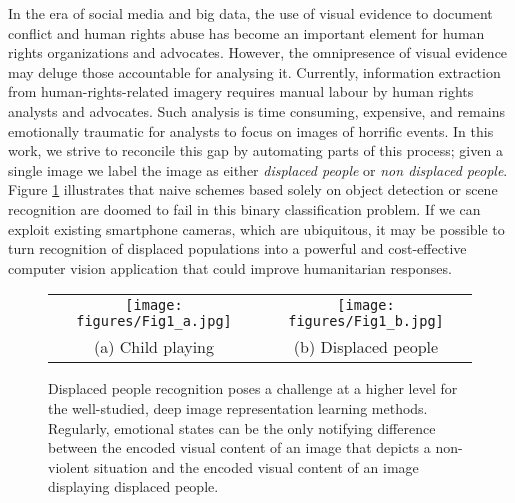\documentclass[10pt,twocolumn,letterpaper]{article}
\begin{document}
In the era of social media and big data, the use of visual evidence to document conflict and human rights abuse has become an important element for human rights organizations and advocates. However, the omnipresence of visual evidence
may deluge those accountable for analysing it. Currently, information extraction from human-rights-related imagery requires manual labour by human rights analysts and advocates. Such analysis is time consuming, expensive, and remains emotionally traumatic for analysts to focus on images of horrific events. In this work, we strive to reconcile this gap by automating parts of this process; given a single image we label the image as either \textit{displaced people} or \textit{non displaced people}. Figure \ref{Fig. 1} illustrates that naive schemes based solely on object detection or scene recognition are doomed to
fail in this binary classification problem. If we can exploit existing smartphone cameras, which are ubiquitous, it may be possible to turn recognition of displaced populations into a powerful and cost-effective computer vision application that could improve humanitarian responses. 


\begin{figure}[t!]
	\centering
	\begin{tabular}{cc}
		\texttt{[image: figures/Fig1\_a.jpg]} &   \texttt{[image: figures/Fig1\_b.jpg]} \\
		(a) Child playing & (b) Displaced people \\[7pt]
	\end{tabular}
	\caption{Displaced people recognition poses a challenge at a higher level for the well-studied, deep image representation learning methods. Regularly, emotional states can be the only notifying difference between the encoded visual content of an image that depicts a non-violent situation and the encoded visual content of an image displaying displaced people.}
	\label{Fig. 1}
\end{figure}
\end{document}
